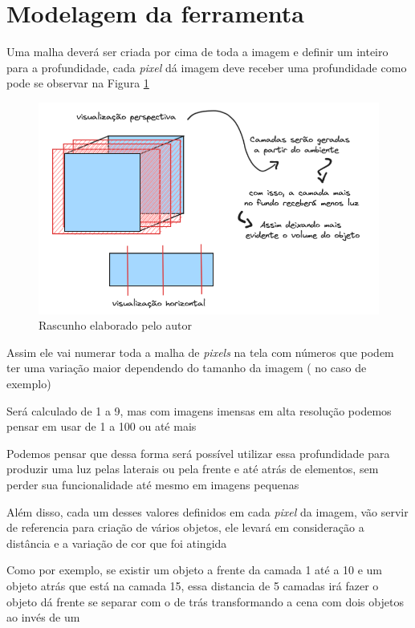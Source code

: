 \section{Modelagem da ferramenta}

Uma malha deverá ser criada por cima de toda a imagem e definir um inteiro para a profundidade, cada \textit{pixel} dá imagem deve receber uma profundidade como pode se observar na Figura \ref{fig:sketch}

\FloatBarrier
\begin{figure}[ht]
    \caption{Rascunho elaborado pelo autor}
    \centering
    \includegraphics[scale=0.5]{imagens/Sketch.png}

    \label{fig:sketch}
\end{figure}
\FloatBarrier

Assim ele vai numerar toda a malha de \textit{pixels} na tela com números que podem ter uma variação maior dependendo do tamanho da imagem ( no caso de exemplo)

Será calculado de 1 a 9, mas com imagens imensas em alta resolução podemos pensar em usar de 1 a 100 ou até mais

Podemos pensar que dessa forma será possível utilizar essa profundidade para produzir uma luz pelas laterais ou pela frente e até atrás de elementos, sem perder sua funcionalidade até mesmo em imagens pequenas

Além disso, cada um desses valores definidos em cada \textit{pixel} da imagem, vão servir de referencia para criação de vários objetos, ele levará em consideração a distância e a variação de cor que foi atingida

Como por exemplo, se existir um objeto a frente da camada 1 até a 10 e um objeto atrás que está na camada 15, essa distancia de 5 camadas irá fazer o objeto dá frente se separar com o de trás transformando a cena com dois objetos ao invés de um

